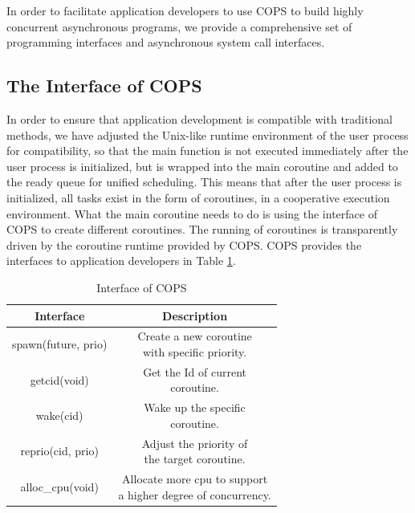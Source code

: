 \documentclass[sigconf,review,anonymous]{acmart}
\begin{document}
In order to facilitate application developers to use COPS to build highly concurrent asynchronous programs, we provide a comprehensive set of programming interfaces and asynchronous system call interfaces.

\subsection{The Interface of COPS}

In order to ensure that application development is compatible with traditional methods, we have adjusted the Unix-like runtime environment of the user process for compatibility, so that the main function is not executed immediately after the user process is initialized, but is wrapped into the main coroutine and added to the ready queue for unified scheduling. This means that after the user process is initialized, all tasks exist in the form of coroutines, in a cooperative execution environment. What the main coroutine needs to do is using the interface of COPS to create different coroutines. The running of coroutines is transparently driven by the coroutine runtime provided by COPS. COPS provides the interfaces to application developers in Table \ref{tab:interface}.


\begin{table}
  \caption{Interface of COPS}
  \label{tab:interface}
  \begin{tabular}{|c|c|}
    \hline
    \textbf{Interface} & \textbf{Description} \\                   
    \hline
    spawn(future, prio) &\makecell{Create a new coroutine \\ with specific priority.} \\
    \hline
    getcid(void) & \makecell{Get the Id of current \\ coroutine.} \\
    \hline
    wake(cid) & \makecell{Wake up the specific \\ coroutine.} \\
    \hline
    reprio(cid, prio) & \makecell{Adjust the priority of \\ the target coroutine.} \\
    \hline
    alloc\_cpu(void) & \makecell{Allocate more cpu to support \\ a higher degree of concurrency.}\\
    \hline

  \end{tabular}
\end{table}
\end{document}
